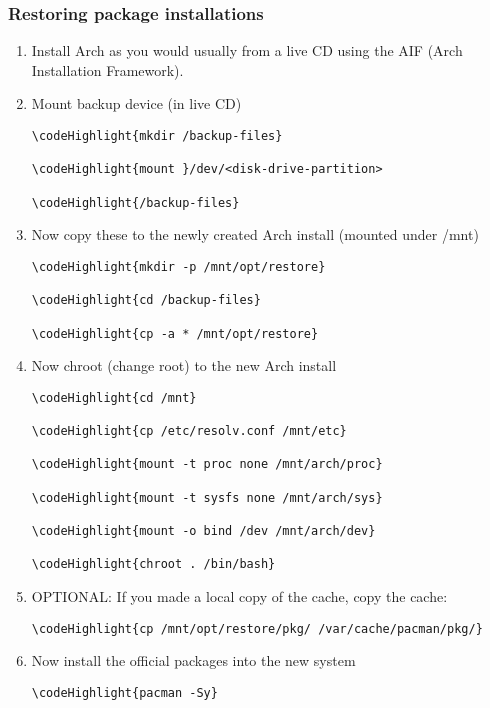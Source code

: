 \documentclass[12pt,a4paper]{article}
\begin{document}
\subsubsection{Restoring package installations}
\begin{enumerate}
\item Install Arch as you would usually from a live CD using the AIF (Arch Installation Framework).
\item Mount backup device (in live CD)
\begin{Verbatim}[commandchars=\\\{\}]
\codeHighlight{mkdir /backup-files}

\codeHighlight{mount }/dev/<disk-drive-partition>

\codeHighlight{/backup-files}
\end{Verbatim}
\item Now copy these to the newly created Arch install (mounted under /mnt)
\begin{Verbatim}[commandchars=\\\{\}]
\codeHighlight{mkdir -p /mnt/opt/restore}

\codeHighlight{cd /backup-files}

\codeHighlight{cp -a * /mnt/opt/restore}
\end{Verbatim}
\item Now chroot (change root) to the new Arch install
\begin{Verbatim}[commandchars=\\\{\}]
\codeHighlight{cd /mnt}

\codeHighlight{cp /etc/resolv.conf /mnt/etc}

\codeHighlight{mount -t proc none /mnt/arch/proc}

\codeHighlight{mount -t sysfs none /mnt/arch/sys}

\codeHighlight{mount -o bind /dev /mnt/arch/dev}

\codeHighlight{chroot . /bin/bash}
\end{Verbatim}
\item OPTIONAL: If you made a local copy of the cache, copy the cache:
\begin{Verbatim}[commandchars=\\\{\}]
\codeHighlight{cp /mnt/opt/restore/pkg/ /var/cache/pacman/pkg/}
\end{Verbatim}
\item Now install the official packages into the new system
\begin{Verbatim}[commandchars=\\\{\}]
\codeHighlight{pacman -Sy}


\end{Verbatim}
\end{enumerate}
\end{document}
